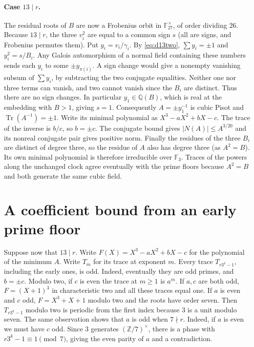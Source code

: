 \documentclass[11pt]{article}
\begin{document}
\paragraph{Case $13\mid r$.}
The residual roots of $B$ are now a Frobenius orbit in
$\mathbb F_{27}^\times$, of order dividing $26$. Because $13\mid r$,
the three $v_i^2$ are equal to a common sign $s$ (all are signs,
and Frobenius permutes them). Put $y_i=v_i/\gamma_i$. By
\eqref{eq:d13two}, $\sum y_i=\pm1$ and $y_i^2=s/B_i$.
Any Galois automorphism of a normal field containing these numbers
sends each $y_i$ to some $\pm y_{\pi(i)}$. A sign change would give
a nonempty vanishing subsum of $\sum y_i$, by subtracting the two
conjugate equalities. Neither one nor three terms can vanish, and
two cannot vanish since the $B_i$ are distinct. Thus there are
no sign changes. In particular $y_1\in\mathbb Q(B)$, which is
real at the embedding with $B>1$, giving $s=1$.
Consequently $A=\pm y_1^{-1}$ is cubic Pisot and
$\operatorname{Tr}(A^{-1})=\pm1$. Write its minimal polynomial as
$X^3-aX^2+bX-c$. The trace of the inverse is $b/c$, so $b=\pm c$.
The conjugate bound gives $|N(A)|\le A^{3/20}$ and its nonreal
conjugate pair gives positive norm. Finally the residues of the
three $B_i$ are distinct of degree three, so the residue of
$A$ also has degree three (as $A^2=B$). Its own minimal
polynomial is therefore irreducible over $\mathbb F_3$. Traces of
the powers along the unchanged clock agree eventually with the prime floors because $A^2=B$ and both generate the same cubic field.
\section{A coefficient bound from an early prime floor}
Suppose now that $13\mid r$. Write $F(X)=X^3-aX^2+bX-c$
for the polynomial of the minimum $A$. Write $T_m$ for its trace at exponent $m$.
Every trace $T_{r3^k-1}$, including the early ones, is odd. Indeed,
eventually they are odd primes, and $b=\pm c$. Modulo two, if $c$ is even
the trace at $m\ge1$ is $a^m$. If $a,c$ are both odd, $F=(X+1)^3$
in characteristic two and all these traces equal one. If $a$ is even
and $c$ odd, $F=X^3+X+1$ modulo two and the roots have order seven.
Then $T_{r3^k-1}$ modulo two is periodic from the first index because
$3$ is a unit modulo seven. The same observation shows that $a$ is
odd when $7\nmid r$. Indeed, if $a$ is even we must have $c$ odd.
Since $3$ generates $(\mathbb Z/7)^\times$, there is a phase with
$r3^k-1\equiv1\pmod7$, giving the even parity of $a$ and a contradiction.
\end{document}
